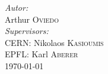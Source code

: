 \begin{titlepage}
\begin{center}
	\emph{Autor:} \\
	Arthur \textsc{Oviedo}\\
    \vspace{0.5cm}
    \emph{Supervisors:} \\   

    CERN: Nikolaos \textsc{Kasioumis} \\   
    EPFL: Karl \textsc{Aberer}\\

	\vspace{0.3cm}
	{\large \today}


\end{center}


\end{titlepage}

\newpage
\thispagestyle{empty}
\mbox{}
